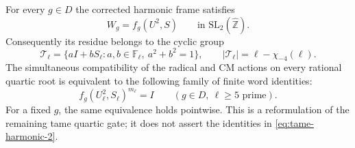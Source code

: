 \begin{proposition}\label{prop:tame-harmonic-word-gate}
For every $g\in D$ the corrected harmonic frame satisfies
\begin{equation}\label{eq:tame-harmonic-1}
W_g=f_g(U^2,S)\qquad\text{in }\mathrm{SL}_2(\widehat{\mathbb Z}).
\end{equation}
Consequently its residue belongs to the cyclic group
\[
 \mathcal T_\ell
 =\{aI+bS_\ell:a,b\in\mathbb F_\ell,\ a^2+b^2=1\},
 \qquad |\mathcal T_\ell|=\ell-\chi_{-4}(\ell).
\]
The simultaneous compatibility of the radical and CM actions
on every rational quartic root is equivalent to the following
family of finite word identities:
\begin{equation}\label{eq:tame-harmonic-2}
\boxed{\quad
 f_g(U_\ell^2,S_\ell)^{m_\ell}=I
 \qquad(g\in D,\ \ell\ge5\text{ prime}).\quad}
\end{equation}
For a fixed $g$, the same equivalence holds pointwise. This is
a reformulation of the remaining tame quartic gate; it does
not assert the identities in \eqref{eq:tame-harmonic-2}.
\end{proposition}
